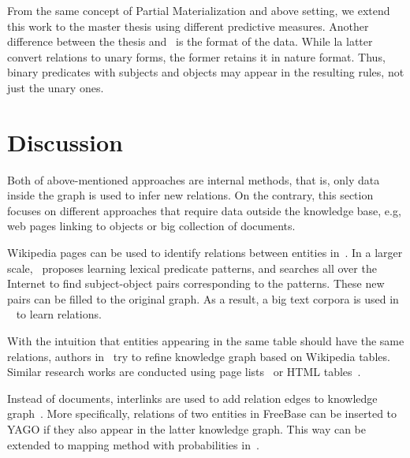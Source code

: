 From the same concept of Partial Materialization and above setting, we extend this work to the master thesis using different predictive measures. Another difference between the thesis and~\cite{ref12} is the format of the data. While la latter convert relations to unary forms, the former retains it in nature format. Thus, binary predicates with subjects and objects may appear in the resulting rules, not just the unary ones.

\section{Discussion}

Both of above-mentioned approaches are internal methods, that is, only data inside the graph is used to infer new relations. On the contrary, this section focuses on different approaches that require data outside the knowledge base, e.g, web pages linking to objects or big collection of documents.

Wikipedia pages can be used to identify relations between entities in~\cite{ref18}. In a larger scale,~\cite{ref19} proposes learning lexical predicate patterns, and searches all over the Internet to find subject-object pairs corresponding to the patterns. These new pairs can be filled to the original graph. As a result, a big text corpora is used in ~\cite{ref19} to learn relations.

With the intuition that entities appearing in the same table should have the same relations, authors in~\cite{ref20} try to refine knowledge graph based on Wikipedia tables. Similar research works are conducted using page lists~\cite{ref21} or HTML tables~\cite{ref22}.

Instead of documents, interlinks are used to add relation edges to knowledge graph~\cite{ref23, ref24}. More specifically, relations of two entities in FreeBase can be inserted to YAGO if they also appear in the latter knowledge graph. This way can be extended to mapping method with probabilities in~\cite{ref25}.